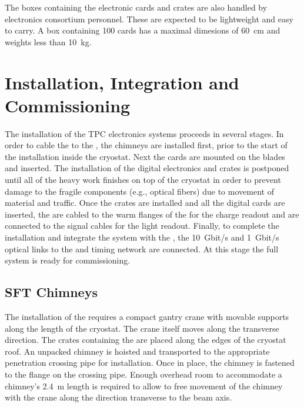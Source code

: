 The boxes containing the electronic cards and  crates are also handled by \dual electronics consortium personnel. These are expected to be lightweight and %
easy to carry. A box containing \num{100}  cards has a maximal dimesions of \SI{60}{\cm} and weights less than \SI{10}{\kg}. 

\section{Installation, Integration and Commissioning}
\label{sec:fddp-tpc-elec-install}

The installation of the TPC electronics systems proceeds in several stages. In order to cable the  to the , %
the chimneys 
are installed first, prior to the start of the  installation inside the cryostat. %
Next the  cards %
are mounted on the blades and inserted. The installation of the digital electronics and  crates %
is postponed until all of the heavy work finishes on top of the cryostat in order to prevent %
damage to the fragile components (e.g., optical fibers)  %
due to movement of material and traffic. %
Once the  crates are installed and all the digital cards are inserted, the %
 are cabled to the warm flanges of the  for the charge readout and are connected to the  signal cables for the light readout. Finally, to complete the installation and integrate the system with the , the \SI{10}{Gbit/s} and \SI{1}{Gbit/s} optical links to the  and  timing network are connected. At this stage the full system is ready for commissioning. 


\subsection{SFT Chimneys}
\label{sec:fddp-tpc-elec-install-sft}

The installation of the  requires a compact gantry crane with %
movable supports along the length of the cryostat. The crane itself moves along the transverse direction. The crates containing the  are placed along the edges of the cryostat roof. An unpacked chimney is hoisted and transported to %
the appropriate penetration crossing pipe for installation. Once in place, the chimney is fastened to the flange on the crossing pipe. %
Enough overhead room to accommodate a chimney's \SI{2.4}{m} length is required
to allow to free movement of the chimney with the crane along the direction transverse to the beam axis. 

